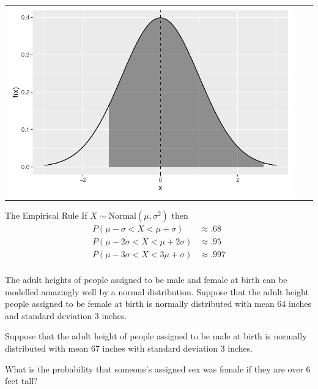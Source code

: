 \begin{frame}
\begin{block}{\examplectd}
\begin{center}
\begin{tabular}{ccc}
    \includegraphics[height = .35\textheight]{figure/exercise-20-8}
    \end{tabular}
    \end{center}
  \end{block}
  
\end{frame}

\begin{frame}
  \begin{block}{The Empirical Rule}
    If $X \sim \mbox{Normal}(\mu,\sigma^2)$ then
    \begin{align*}
      P(\mu-\sigma < X < \mu + \sigma) & \approx .68\\
      P(\mu-2\sigma < X < \mu + 2\sigma) & \approx .95\\
      P(\mu-3\sigma < X < 3\mu + \sigma) & \approx .997\\
    \end{align*}
  \end{block}
\end{frame}

\begin{frame}
  \begin{block}{\examplectd}
    The adult heights of people assigned to be male and female at birth can be modelled amazingly well by a normal distribution. Suppose that the adult height people assigned to be female at birth is normally distributed with mean 64 inches and standard deviation 3 inches.

    \bigskip
    
    Suppose that the adult height of people assigned to be male at birth is normally distributed with mean 67 inches with standard deviation 3 inches.

    \bigskip

    What is the probability that someone's assigned sex was female if they are over 6 feet tall?
  \end{block}
\end{frame}



